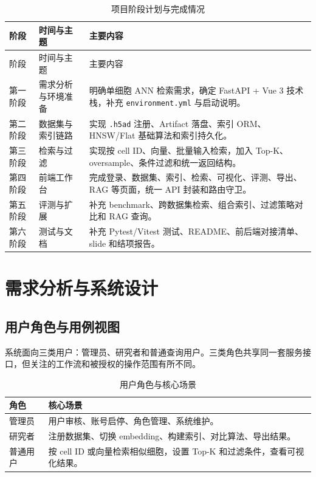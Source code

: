 \documentclass[UTF8,a4paper,12pt]{ctexrep}
\begin{document}
\begin{longtable}{L{0.16\textwidth}L{0.28\textwidth}L{0.46\textwidth}}
  \caption{项目阶段计划与完成情况} \\
  \toprule
  阶段 & 时间与主题 & 主要内容 \\
  \midrule
  \endfirsthead
  \toprule
  阶段 & 时间与主题 & 主要内容 \\
  \midrule
  \endhead
  第一阶段 & 需求分析与环境准备 & 明确单细胞 ANN 检索需求，确定 FastAPI + Vue 3 技术栈，补充 \texttt{environment.yml} 与启动说明。 \\
  第二阶段 & 数据集与索引链路 & 实现 \texttt{.h5ad} 注册、Artifact 落盘、索引 ORM、HNSW/Flat 基础算法和索引持久化。 \\
  第三阶段 & 检索与过滤 & 实现按 cell ID、向量、批量输入检索，加入 Top-K、oversample、条件过滤和统一返回结构。 \\
  第四阶段 & 前端工作台 & 完成登录、数据集、索引、检索、可视化、评测、导出、RAG 等页面，统一 API 封装和路由守卫。 \\
  第五阶段 & 评测与扩展 & 补充 benchmark、跨数据集检索、组合索引、过滤策略对比和 RAG 查询。 \\
  第六阶段 & 测试与文档 & 补充 Pytest/Vitest 测试、README、前后端对接清单、slide 和结项报告。 \\
  \bottomrule
\end{longtable}

\chapter{需求分析与系统设计}

\section{用户角色与用例视图}

系统面向三类用户：管理员、研究者和普通查询用户。三类角色共享同一套服务接口，但关注的工作流和被授权的操作范围有所不同。

\begin{table}[H]
  \centering
  \caption{用户角色与核心场景}
  \begin{tabularx}{0.95\textwidth}{lY}
    \toprule
    角色 & 核心场景 \\
    \midrule
    管理员 & 用户审核、账号启停、角色管理、系统维护。 \\
    研究者 & 注册数据集、切换 embedding、构建索引、对比算法、导出结果。 \\
    普通用户 & 按 cell ID 或向量检索相似细胞，设置 Top-K 和过滤条件，查看可视化结果。 \\
    \bottomrule
  \end{tabularx}
\end{table}
\end{document}
